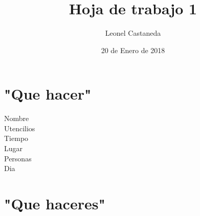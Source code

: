 \documentclass[10pt, a4paper]{article}
\author{Leonel Castaneda}
\date{20 de Enero de 2018}
\begin{document}
 
\title{Hoja de trabajo 1}
\maketitle 


    
\section{"Que hacer"} %
Nombre\\ 
Utencilios\\ 
Tiempo\\ 
Lugar\\
Personas\\
Dia\\ 
          
\section{"Que haceres"} 

    
        
\end{document}
